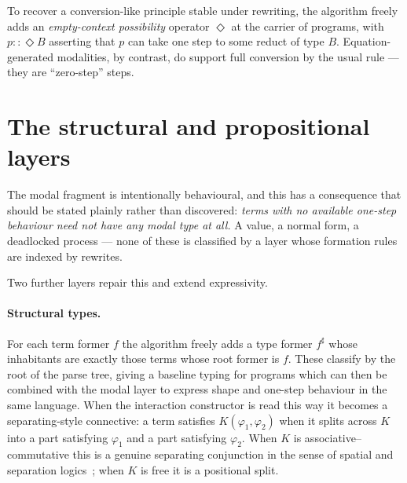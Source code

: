 
To recover a conversion-like principle stable under rewriting, the algorithm freely adds
an \emph{empty-context possibility} operator $\Diamond$ at the carrier of programs, with
$p :: \Diamond B$ asserting that $p$ can take one step to some reduct of type $B$.
Equation-generated modalities, by contrast, do support full conversion by the usual rule ---
they are ``zero-step'' steps.

\section{The structural and propositional layers}

The modal fragment is intentionally behavioural, and this has a consequence that should
be stated plainly rather than discovered: \emph{terms with no available one-step behaviour
need not have any modal type at all.} A value, a normal form, a deadlocked process ---
none of these is classified by a layer whose formation rules are indexed by rewrites.

Two further layers repair this and extend expressivity.

\paragraph{Structural types.} For each term former $f$ the algorithm freely adds a type
former $f^\sharp$ whose inhabitants are exactly those terms whose root former is $f$.
These classify by the root of the parse tree, giving a baseline typing for programs which
can then be combined with the modal layer to express shape and one-step behaviour in the
same language. When the interaction constructor is read this way it becomes a
separating-style connective: a term satisfies $K(\varphi_1,\varphi_2)$ when it splits
across $K$ into a part satisfying $\varphi_1$ and a part satisfying $\varphi_2$. When $K$
is associative--commutative this is a genuine separating conjunction in the sense of
spatial and separation logics~\cite{CairesCardelli,Reynolds2002}; when $K$ is free it
is a positional split.

